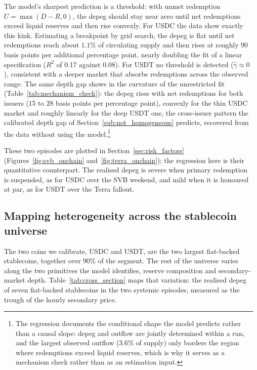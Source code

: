 The model's sharpest prediction is a threshold: with unmet redemption $U = \max(D-R,0)$, the depeg should stay near zero until net redemptions exceed liquid reserves and then rise convexly. For USDC the data show exactly this kink. Estimating a breakpoint by grid search, the depeg is flat until net redemptions reach about $1.1\%$ of circulating supply and then rises at roughly 90 basis points per additional percentage point, nearly doubling the fit of a linear specification ($R^2$ of 0.17 against 0.08). For USDT no threshold is detected ($\hat\gamma \approx 0$), consistent with a deeper market that absorbs redemptions across the observed range. The same depth gap shows in the curvature of the unrestricted fit (Table~\ref{tab:mechanism_check}): the depeg rises with net redemptions for both issuers (15 to 28 basis points per percentage point), convexly for the thin USDC market and roughly linearly for the deep USDT one, the cross-issuer pattern the calibrated depth gap of Section~\ref{sub:not_homogeneous} predicts, recovered from the data without using the model.\footnote{The regression documents the conditional shape the model predicts rather than a causal slope: depeg and outflow are jointly determined within a run, and the largest observed outflow (3.6\% of supply) only borders the region where redemptions exceed liquid reserves, which is why it serves as a mechanism check rather than as an estimation input.}

These two episodes are plotted in Section~\ref{sec:risk_factors} (Figures~\ref{fig:svb_onchain} and~\ref{fig:terra_onchain}); the regression here is their quantitative counterpart. The realised depeg is severe when primary redemption is suspended, as for USDC over the SVB weekend, and mild when it is honoured at par, as for USDT over the Terra fallout.

\subsection{Mapping heterogeneity across the stablecoin universe}\label{sub:cross_section}

The two coins we calibrate, USDC and USDT, are the two largest fiat-backed stablecoins, together over 90\% of the segment. The rest of the universe varies along the two primitives the model identifies, reserve composition and secondary-market depth. Table~\ref{tab:cross_section} maps that variation: the realised depeg of seven fiat-backed stablecoins in the two systemic episodes, measured as the trough of the hourly secondary price.

